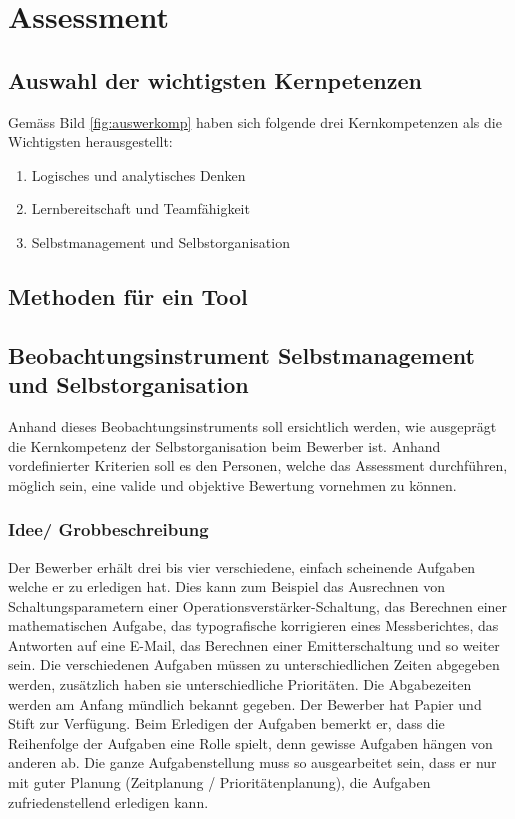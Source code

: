 \chapter{Assessment}

\section{Auswahl der wichtigsten Kernpetenzen}

Gemäss Bild \ref{fig:auswerkomp} haben sich folgende drei Kernkompetenzen als die Wichtigsten herausgestellt:

\begin{enumerate} 
\item{Logisches und analytisches Denken}
\item{Lernbereitschaft und Teamfähigkeit}
\item{Selbstmanagement und Selbstorganisation}
\end{enumerate}

\section{Methoden für ein Tool}

\section{Beobachtungsinstrument Selbstmanagement und Selbstorganisation}

Anhand dieses Beobachtungsinstruments soll ersichtlich werden, wie ausgeprägt die Kernkompetenz der Selbstorganisation beim Bewerber ist. Anhand vordefinierter Kriterien soll es den Personen, welche das Assessment durchführen, möglich sein, eine valide und objektive Bewertung vornehmen zu können.

\subsection{Idee/ Grobbeschreibung}

Der Bewerber erhält drei bis vier verschiedene, einfach scheinende Aufgaben welche er zu erledigen hat. Dies kann zum Beispiel das Ausrechnen von Schaltungsparametern einer Operationsverstärker-Schaltung, das Berechnen einer
mathematischen Aufgabe, das typografische korrigieren eines Messberichtes, das Antworten auf eine E-Mail, das Berechnen einer Emitterschaltung und so weiter sein. Die verschiedenen Aufgaben müssen zu unterschiedlichen Zeiten abgegeben werden, zusätzlich haben sie unterschiedliche Prioritäten. Die Abgabezeiten werden am Anfang mündlich bekannt gegeben. Der Bewerber hat Papier und Stift zur Verfügung.
Beim Erledigen der Aufgaben bemerkt er, dass die Reihenfolge der Aufgaben eine Rolle spielt, denn gewisse Aufgaben hängen von anderen ab. Die ganze Aufgabenstellung muss so ausgearbeitet sein, dass er nur mit
guter Planung (Zeitplanung / Prioritätenplanung), die Aufgaben zufriedenstellend erledigen kann.


